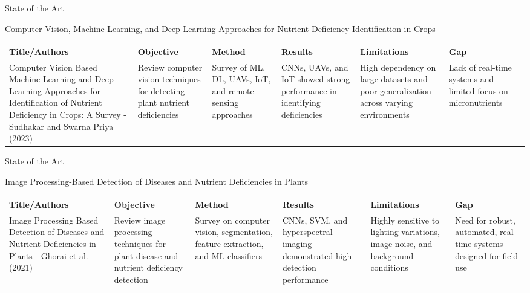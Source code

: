 \documentclass[aspectratio=169]{beamer}
\begin{document}
\begin{frame}[t]{State of the Art}
  \scriptsize

  Computer Vision, Machine Learning, and Deep Learning Approaches for Nutrient Deficiency Identification in Crops
  
  \vspace{0.3cm}
  
  \begin{table}
    \centering
    \tiny
    \begin{tabular}{|p{2.5cm}|p{2cm}|p{2cm}|p{2cm}|p{2cm}|p{1.5cm}|}
      \hline
      \textbf{Title/Authors} & \textbf{Objective} & \textbf{Method} & \textbf{Results} & \textbf{Limitations} & \textbf{Gap} \\
      \hline
      Computer Vision Based Machine Learning and Deep Learning Approaches for Identification of Nutrient Deficiency in Crops: A Survey - Sudhakar and Swarna Priya (2023)
      & Review computer vision techniques for detecting plant nutrient deficiencies
      & Survey of ML, DL, UAVs, IoT, and remote sensing approaches
      & CNNs, UAVs, and IoT showed strong performance in identifying deficiencies
      & High dependency on large datasets and poor generalization across varying environments
      & Lack of real-time systems and limited focus on micronutrients
      \\
      \hline
    \end{tabular}
  \end{table}
\end{frame}

\begin{frame}[t]{State of the Art}
  \scriptsize

  Image Processing-Based Detection of Diseases and Nutrient Deficiencies in Plants

  \vspace{0.3cm}
  
  \begin{table}
    \centering
    \tiny
    \begin{tabular}{|p{2.5cm}|p{2cm}|p{2cm}|p{2cm}|p{2cm}|p{1.5cm}|}
      \hline
      \textbf{Title/Authors} & \textbf{Objective} & \textbf{Method} & \textbf{Results} & \textbf{Limitations} & \textbf{Gap} \\
      \hline
      Image Processing Based Detection of Diseases and Nutrient Deficiencies in Plants - Ghorai et al. (2021)
      & Review image processing techniques for plant disease and nutrient deficiency detection
      & Survey on computer vision, segmentation, feature extraction, and ML classifiers
      & CNNs, SVM, and hyperspectral imaging demonstrated high detection performance
      & Highly sensitive to lighting variations, image noise, and background conditions
      & Need for robust, automated, real-time systems designed for field use
      \\
      \hline
    \end{tabular}
  \end{table}
\end{frame}
\end{document}
